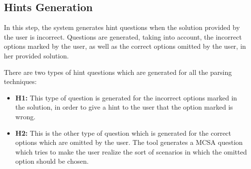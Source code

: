 \subsection{Hints Generation}
\label{subsec:hints generation}
In this step, the system generates hint questions when the solution provided by the user is incorrect. Questions are generated, taking into account, the incorrect options marked by the user, as well as the correct options omitted by the user, in her provided solution.

There are two types of hint questions which are generated for all the parsing techniques:
\begin{itemize}
\item \textbf{H1:} This type of question is generated for the incorrect options marked in the solution, in order to give a hint to the user that the option marked is wrong.
\item \textbf{H2:} This is the other type of question which is generated for the correct options which are omitted by the user. The tool generates a MCSA question which tries to make the user realize the sort of scenarios in which the omitted option should be chosen.
\end{itemize}

